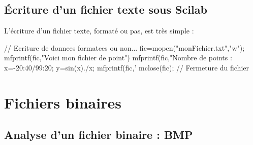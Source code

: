 \documentclass[10pt,fleqn]{article} %
\begin{document}
\subsection{Écriture d'un fichier texte sous Scilab}
L'écriture d'un fichier texte, formaté ou pas, est très simple :
\begin{sci}
\begin{scilab}[h]
// Ecriture de donnees formatees ou non...
fic=mopen("monFichier.txt","w");
mfprintf(fic,"Voici mon fichier de point\n")
mfprintf(fic,"Nombre de points : %
x=-20:40/99:20;
y=sin(x)./x;
mfprintf(fic,'%
mclose(fic); // Fermeture du fichier
\end{scilab}
\end{sci}


\section{Fichiers binaires}

\subsection{Analyse d'un fichier binaire : BMP}
\end{document}
